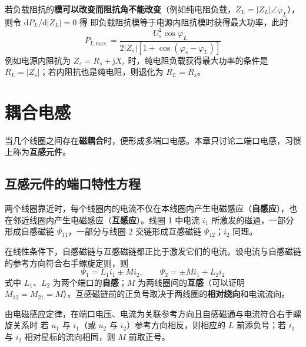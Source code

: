 若负载阻抗的\textbf{模可以改变而阻抗角不能改变}（例如纯电阻负载，$Z_L=|Z_L|\angle\varphi_L$），则令 $\mathrm{d}P_L/\mathrm{d}|Z_L|=0$ 得
即负载阻抗模等于电源内阻抗模时获得最大功率，此时
\begin{equation}
P_{L\max}=\frac{U_s^2\cos\varphi_L}{2|Z_s|\left[1+\cos\left(\varphi_s-\varphi_L\right)\right]}
\end{equation}
例如电源内阻抗为 $Z_s=R_s+\mathrm{j}X_s$ 时，纯电阻负载获得最大功率的条件是 $R_L=|Z_s|$；若内阻抗也是纯电阻，则退化为 $R_L=R_s$。


\section{耦合电感}
当几个线圈之间存在\textbf{磁耦合}时，便形成多端口电感。本章只讨论二端口电感，习惯上称为\textbf{互感元件}。

\subsection{互感元件的端口特性方程}
两个线圈靠近时，每个线圈内的电流不仅在本线圈内产生电磁感应（\textbf{自感应}），也在邻近线圈内产生电磁感应（\textbf{互感应}）。线圈 1 中电流 $i_1$ 所激发的磁通，一部分形成自感磁链 $\Psi_{11}$，一部分与线圈 2 交链形成互感磁链 $\Psi_{12}$；$i_2$ 同理。

在线性条件下，自感磁链与互感磁链都正比于激发它们的电流。设电流与自感磁链的参考方向符合右手螺旋定则，则
\begin{equation}
\Psi_1=L_1i_1\pm Mi_2,\qquad \Psi_2=\pm Mi_1+L_2i_2
\end{equation}
式中 $L_1$、$L_2$ 为两个端口的\textbf{自感}；$M$ 为两线圈间的\textbf{互感}（可以证明 $M_{12}=M_{21}=M$）。互感磁链前的正负号取决于两线圈的\textbf{相对绕向}和电流流向。

由电磁感应定律，在端口电压、电流为关联参考方向且自感磁通与电流符合右手螺旋关系时
若 $u_1$ 与 $i_1$（或 $u_2$ 与 $i_2$）参考方向相反，则相应的 $L$ 前添负号；若 $i_1$ 与 $i_2$ 相对星标的流向相同，则 $M$ 前取正号。

